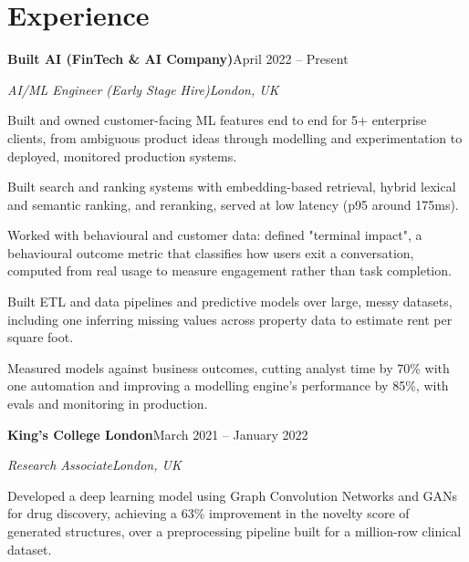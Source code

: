 \documentclass[10pt,a4paper]{article}
\newcommand{\entry}[4]{%
  {\color{company}\bfseries #1}\hfill {\color{muted}#2}\par
  \vspace{1pt}
  {\itshape #3}\hfill {\color{muted}\itshape #4}\par
  \vspace{3pt}%
}
\begin{document}
\section{Experience}
\entry{Built AI (FinTech \& AI Company)}{April 2022 -- Present}{AI/ML Engineer (Early Stage Hire)}{London, UK}
\begin{tight}
  \item Built and owned customer-facing ML features end to end for 5+ enterprise clients, from ambiguous product ideas through modelling and experimentation to deployed, monitored production systems.
  \item Built search and ranking systems with embedding-based retrieval, hybrid lexical and semantic ranking, and reranking, served at low latency (p95 around 175ms).
  \item Worked with behavioural and customer data: defined "terminal impact", a behavioural outcome metric that classifies how users exit a conversation, computed from real usage to measure engagement rather than task completion.
  \item Built ETL and data pipelines and predictive models over large, messy datasets, including one inferring missing values across property data to estimate rent per square foot.
  \item Measured models against business outcomes, cutting analyst time by 70\% with one automation and improving a modelling engine's performance by 85\%, with evals and monitoring in production.
\end{tight}

\entry{King's College London}{March 2021 -- January 2022}{Research Associate}{London, UK}
\begin{tight}
  \item Developed a deep learning model using Graph Convolution Networks and GANs for drug discovery, achieving a 63\% improvement in the novelty score of generated structures, over a preprocessing pipeline built for a million-row clinical dataset.
\end{tight}

\end{document}
